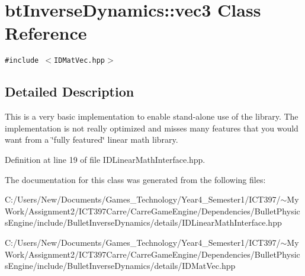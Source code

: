\hypertarget{classbt_inverse_dynamics_1_1vec3}{
\section{btInverseDynamics::vec3 Class Reference}
\label{classbt_inverse_dynamics_1_1vec3}
}
{\tt \#include $<$IDMatVec.hpp$>$}



\subsection{Detailed Description}
This is a very basic implementation to enable stand-alone use of the library. The implementation is not really optimized and misses many features that you would want from a \char`\"{}fully featured\char`\"{} linear math library. 

Definition at line 19 of file IDLinearMathInterface.hpp.

The documentation for this class was generated from the following files:\begin{CompactItemize}
\item 
C:/Users/New/Documents/Games\_\-Technology/Year4\_\-Semester1/ICT397/$\sim$My Work/Assignment2/ICT397Carre/CarreGameEngine/Dependencies/BulletPhysicsEngine/include/BulletInverseDynamics/details/IDLinearMathInterface.hpp\item 
C:/Users/New/Documents/Games\_\-Technology/Year4\_\-Semester1/ICT397/$\sim$My Work/Assignment2/ICT397Carre/CarreGameEngine/Dependencies/BulletPhysicsEngine/include/BulletInverseDynamics/details/IDMatVec.hpp\end{CompactItemize}
